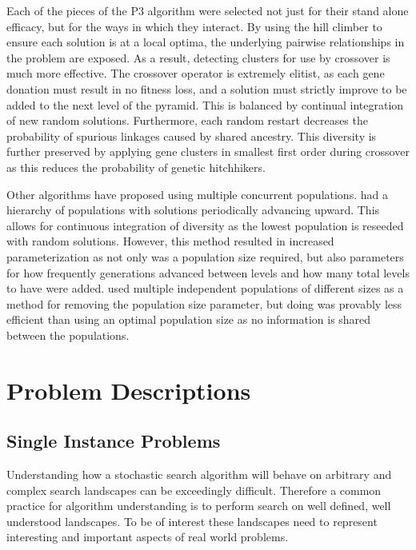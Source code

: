 \documentclass[twoside]{article}
\begin{document}
Each of the pieces of the P3 algorithm were selected not just for their stand alone efficacy,
but for the ways in which they interact. By using the hill climber to ensure each solution
is at a local optima, the underlying pairwise relationships in the problem are exposed. As
a result, detecting clusters for use by crossover is much more effective. The crossover operator
is extremely elitist, as each gene donation must result in no fitness loss, and a solution must
strictly improve to be added to the next level of the pyramid. This is balanced by continual
integration of new random solutions. Furthermore, each random restart decreases the probability
of spurious linkages caused by shared ancestry. This diversity is further preserved by applying
gene clusters in smallest first order during crossover as this reduces the probability of genetic
hitchhikers.

Other algorithms have proposed using multiple concurrent populations.
\cite{hornby:2006:alps} had a hierarchy of populations with solutions periodically advancing
upward. This allows for continuous integration of diversity as the lowest population is reseeded
with random solutions. However, this method resulted in increased parameterization as not only was
a population size required, but also parameters for how frequently generations advanced between levels and
how many total levels to have were added. \cite{harik:1999:parameterlessga} used multiple independent
populations of different sizes as a method for removing the population size parameter, but
doing was provably less efficient than using an optimal population size as no information is shared
between the populations.

\section{Problem Descriptions}
\label{sec-problems}

\subsection{Single Instance Problems}
Understanding how a stochastic search algorithm will behave on arbitrary and complex
search landscapes can be exceedingly difficult. Therefore a common practice for
algorithm understanding is to perform search on well defined, well understood
landscapes. To be of interest these landscapes need to represent interesting
and important aspects of real world problems.
\end{document}
